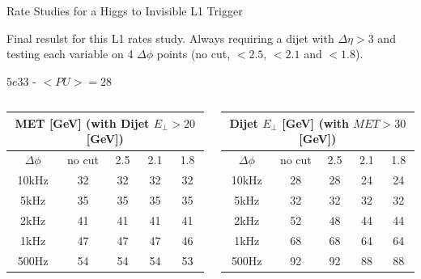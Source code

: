\documentclass[8pt]{beamer}
\begin{document}
\begin{frame}{Rate Studies for a Higgs to Invisible L1 Trigger}

  Final resulst for this L1 rates study. Always requiring a dijet with $\Delta\eta>3$ and testing 
  each variable on 4 $\Delta\phi$ points (no cut, $<2.5$, $<2.1$ and $<1.8$).

\begin{block}{$5e33$ - $<PU>=28$}

  \begin{columns}

  \column[t]{5.5cm}  
\begin{footnotesize} 
\begin{tabular}{|c||c|c|c|c|}
\hline
\multicolumn{5}{|c|}{MET [GeV] (with Dijet $E_\bot>20$ [GeV])} \\
\hline
$\Delta\phi$ & no cut & 2.5 & 2.1 & 1.8 \\
\hline
10kHz        &     32 &  32 &  32 &  32 \\
5kHz         &     35 &  35 &  35 &  35 \\
\cellcolor{green}2kHz &\cellcolor{green}      41 &  41 &  41 &  41 \\
1kHz         &     47 &  47 &  47 &  46 \\
500Hz        &     54 &  54 &  54 &  53 \\
\hline
\end{tabular}
\end{footnotesize}

  \column[t]{5.5cm}  
\begin{footnotesize} 
\begin{tabular}{|c||c|c|c|c|}
\hline
\multicolumn{5}{|c|}{Dijet $E_\bot$ [GeV] (with $MET>30$ [GeV])} \\
\hline
$\Delta\phi$ & no cut & 2.5 & 2.1 & 1.8 \\
\hline
10kHz        &     28 &  28 &  24 &  24 \\
5kHz         &     32 &  32 &  32 &  32 \\
\cellcolor{green} 2kHz         &\cellcolor{green}      52 &  48 &  44 &  44 \\
1kHz         &     68 &  68 &  64 &  64 \\
500Hz        &     92 &  92 &  88 &  88 \\
\hline
\end{tabular}
\end{footnotesize}

  \end{columns}


\end{block}
\end{frame}
\end{document}
